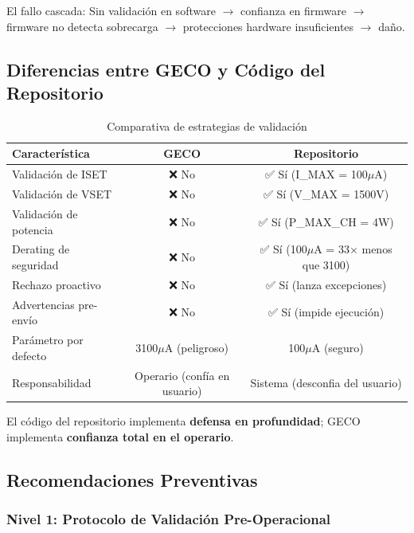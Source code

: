 \documentclass{article}
\begin{document}
El fallo cascada: Sin validación en software $\rightarrow$ confianza en firmware $\rightarrow$ firmware no detecta sobrecarga $\rightarrow$ protecciones hardware insuficientes $\rightarrow$ daño.

\subsection{Diferencias entre GECO y Código del Repositorio}

\begin{table}[h]
    \centering
    \begin{tabular}{|l|c|c|}
        \hline
        \textbf{Característica} & \textbf{GECO} & \textbf{Repositorio} \\
        \hline
        \hline
        Validación de ISET & ❌ No & ✅ Sí (I\_MAX = 100\(\mu\)A) \\
        Validación de VSET & ❌ No & ✅ Sí (V\_MAX = 1500V) \\
        Validación de potencia & ❌ No & ✅ Sí (P\_MAX\_CH = 4W) \\
        Derating de seguridad & ❌ No & ✅ Sí (100\(\mu\)A = 33× menos que 3100) \\
        Rechazo proactivo & ❌ No & ✅ Sí (lanza excepciones) \\
        Advertencias pre-envío & ❌ No & ✅ Sí (impide ejecución) \\
        Parámetro por defecto & 3100\(\mu\)A (peligroso) & 100\(\mu\)A (seguro) & \\
        Responsabilidad & Operario (confía en usuario) & Sistema (desconfia del usuario) & \\
        \hline
    \end{tabular}
    \caption{Comparativa de estrategias de validación}
\end{table}

El código del repositorio implementa \textbf{defensa en profundidad}; GECO implementa \textbf{confianza total en el operario}.

\subsection{Recomendaciones Preventivas}

\subsubsection{Nivel 1: Protocolo de Validación Pre-Operacional}
\end{document}
